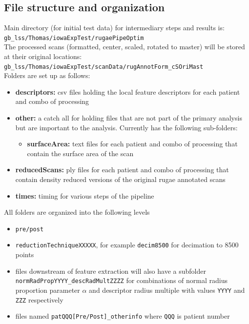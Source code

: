 \documentclass[11pt]{article}
\theoremstyle{definition}
\begin{document}
\subsection{File structure and organization}

Main directory (for initial test data) for intermediary steps and results is: \\
\texttt{gb\_lss/Thomas/iowaExpTest/rugaePipeOptim} \\
The processed scans (formatted, center, scaled, rotated to master) will be stored at their original locations: \\
\texttt{gb\_lss/Thomas/iowaExpTest/scanData/rugAnnotForm\_cSOriMast} \\
Folders are set up as follows:

\begin{itemize}
    \item \textbf{descriptors:} csv files holding the local feature descriptors for each patient and combo of processing
    \item \textbf{other:} a catch all for holding files that are not part of the primary analysis but are important to the analysis. Currently has the following sub-folders:
    \begin{itemize}
        \item \textbf{surfaceArea:} text files for each patient and combo of processing that contain the surface area of the scan
    \end{itemize}
    \item \textbf{reducedScans:} ply files for each patient and combo of processing that contain density reduced versions of the original rugae annotated scans
    \item \textbf{times:} timing for various steps of the pipeline
\end{itemize}

All folders are organized into the following levels
\begin{itemize}
    \item \texttt{pre/post} 
    \item \texttt{reductionTechniqueXXXXX}, for example \texttt{decim8500} for decimation to 8500 points
    \item files downstream of feature extraction will also have a subfolder \texttt{normRadPropYYYY\_descRadMultZZZZ} for combinations of normal radius proportion parameter $\alpha$ and descriptor radius multiple with values \texttt{YYYY} and \texttt{ZZZ} respectively
    \item files named \texttt{patQQQ[Pre/Post]\_otherinfo} where \texttt{QQQ} is patient number
\end{itemize}
\end{document}
